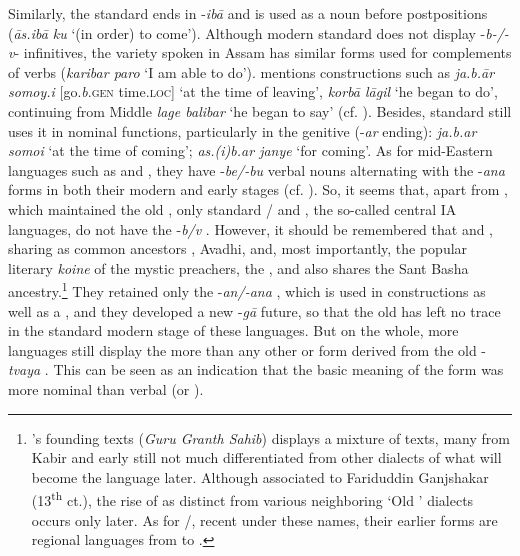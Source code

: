 \documentclass[output=paper]{langsci/langscibook}
\begin{document}
Similarly, the standard   ends in -\textit{ibā} and is used as a noun before postpositions (\textit{ās.ibā ku} ‘(in order) to come’). Although modern standard  does not display -\textit{b-/-v}{}- infinitives, the variety spoken in Assam \citep{Tunga1995} has similar forms used for complements of  verbs (\textit{karibar paro} ‘I am able to do’). \citet{Grierson1903-1928} mentions  constructions such as \textit{ja.b.ār somoy.i} [go.\textit{b}.\textsc{gen} time.\textsc{loc]} ‘at the time of leaving’, \textit{korbā lāgil} ‘he began to do’, continuing from Middle  \textit{lage balibar} ‘he began to say’ (cf. \citealt[1008]{Chatterji1926}). Besides, standard  still uses it in nominal functions, particularly in the genitive (-\textit{ar} ending): \textit{ja.b.ar somoi} ‘at the time of coming’; \textit{as.(i)b.ar janye} ‘for coming’. As for mid-Eastern languages such as  and , they have -\textit{be/-bu} verbal nouns alternating with the -\textit{ana} forms in both their modern and early stages (cf. \citealt[282--285]{Saxena1937}). So, it seems that, apart from , which maintained the old  , only standard / and , the so-called central IA languages, do not have the -\textit{b/v} . However, it should be remembered that  and  , sharing as common ancestors , Avadhi, and, most importantly, the popular literary \textit{koine} of the mystic preachers, the , and  also shares the Sant Basha ancestry.\footnote{’s founding texts (\textit{Guru Granth Sahib}) displays a mixture of  texts, many from Kabir and early  still not much differentiated from other dialects of what will become the  language later. Although associated to Fariduddin Ganjshakar (13\textsuperscript{th} ct.), the rise of  as distinct from various neighboring ‘Old ’ dialects occurs only later. As for /, recent under these names, their earlier forms are regional languages from  to .} They retained only the -\textit{an/-ana} , which is used in  constructions as well as a , and they developed a new  -\textit{gā} future, so that the old  has left no trace in the standard modern stage of these languages. But on the whole, more languages still display the  more than any other  or  form derived from the old -\textit{tvaya} . This can be seen as an indication that the basic meaning of the form was more nominal than verbal (or ).
\end{document}

